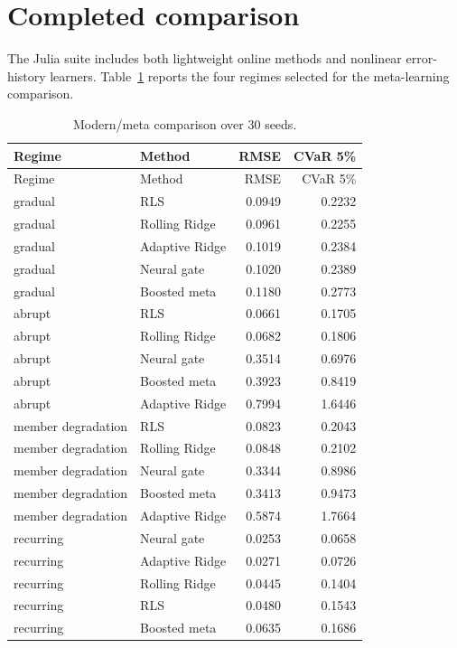 \documentclass[10pt]{report}
\begin{document}
\section{Completed comparison}
The Julia suite includes both lightweight online methods and nonlinear error-history learners. Table~\ref{tab:meta} reports the four regimes selected for the meta-learning comparison.
\begin{longtable}{llrr}
\caption{Modern/meta comparison over 30 seeds.}\label{tab:meta}\\
\toprule
Regime & Method & RMSE & CVaR 5\% \\
\midrule
\endfirsthead
\toprule
Regime & Method & RMSE & CVaR 5\% \\
\midrule
\endhead
gradual & RLS & 0.0949 & 0.2232 \\
gradual & Rolling Ridge & 0.0961 & 0.2255 \\
gradual & Adaptive Ridge & 0.1019 & 0.2384 \\
gradual & Neural gate & 0.1020 & 0.2389 \\
gradual & Boosted meta & 0.1180 & 0.2773 \\
abrupt & RLS & 0.0661 & 0.1705 \\
abrupt & Rolling Ridge & 0.0682 & 0.1806 \\
abrupt & Neural gate & 0.3514 & 0.6976 \\
abrupt & Boosted meta & 0.3923 & 0.8419 \\
abrupt & Adaptive Ridge & 0.7994 & 1.6446 \\
member degradation & RLS & 0.0823 & 0.2043 \\
member degradation & Rolling Ridge & 0.0848 & 0.2102 \\
member degradation & Neural gate & 0.3344 & 0.8986 \\
member degradation & Boosted meta & 0.3413 & 0.9473 \\
member degradation & Adaptive Ridge & 0.5874 & 1.7664 \\
recurring & Neural gate & 0.0253 & 0.0658 \\
recurring & Adaptive Ridge & 0.0271 & 0.0726 \\
recurring & Rolling Ridge & 0.0445 & 0.1404 \\
recurring & RLS & 0.0480 & 0.1543 \\
recurring & Boosted meta & 0.0635 & 0.1686 \\
\bottomrule
\end{longtable}
\end{document}
